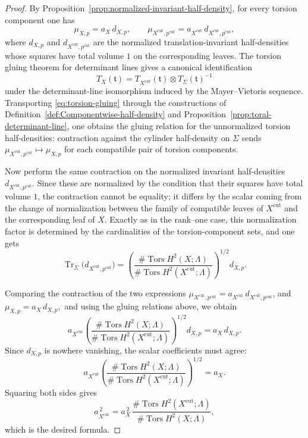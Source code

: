 \documentclass[12pt]{amsart}
\numberwithin{equation}{section}
\begin{document}
\begin{proof}
By Proposition~\ref{prop:normalized-invariant-half-density}, for every torsion component one has
\[
\mu_{X,p}=a_X\,d_{X,p},
\qquad
\mu_{X^{\mathrm{cut}},p^{\mathrm{cut}}}
=
a_{X^{\mathrm{cut}}}\,d_{X^{\mathrm{cut}},p^{\mathrm{cut}}},
\]
where $d_{X,p}$ and $d_{X^{\mathrm{cut}},p^{\mathrm{cut}}}$ are the normalized translation-invariant
half-densities whose squares have total volume $1$ on the corresponding leaves. The torsion gluing theorem for determinant lines gives a canonical identification
\begin{equation}\label{eq:torsion-gluing}
T_X(\mathfrak t)
=
T_{X^{\mathrm{cut}}}(\mathfrak t)\otimes T_\Sigma(\mathfrak t)^{-1}
\end{equation}
under the determinant-line isomorphism induced by the Mayer--Vietoris sequence. Transporting
\eqref{eq:torsion-gluing} through the constructions of
Definition~\ref{def:Componentwise-half-density} and Proposition~\ref{prop:toral-determinant-line}, one obtains
the gluing relation for the unnormalized torsion half-densities: contraction against the cylinder
half-density on $\Sigma$ sends $\mu_{X^{\mathrm{cut}},p^{\mathrm{cut}}}
\mapsto
\mu_{X,p}$ for each compatible pair of torsion components.

Now perform the same contraction on the normalized invariant half-densities
$d_{X^{\mathrm{cut}},p^{\mathrm{cut}}}$. Since these are normalized by the condition that their squares
have total volume $1$, the contraction cannot be equality; it differs by the scalar coming from
the change of normalization between the family of compatible leaves of $X^{\mathrm{cut}}$ and the
corresponding leaf of $X$. Exactly as in the rank--one case, this normalization factor is determined by the
cardinalities of the torsion-component sets, and one gets
\begin{equation}\label{eq:normalized-density-gluing}
\operatorname{Tr}_\Sigma\!\bigl(d_{X^{\mathrm{cut}},p^{\mathrm{cut}}}\bigr)
=
\left(
\frac{\#\operatorname{Tors}H^2(X;\Lambda)}
     {\#\operatorname{Tors}H^2(X^{\mathrm{cut}};\Lambda)}
\right)^{1/2}
d_{X,p}.
\end{equation}

Comparing the contraction of the two expressions
$\mu_{X^{\mathrm{cut}},p^{\mathrm{cut}}}
=
a_{X^{\mathrm{cut}}}\,d_{X^{\mathrm{cut}},p^{\mathrm{cut}}}$, and $\mu_{X,p}=a_X\,d_{X,p},$ and using the gluing relations above, we obtain
\[
a_{X^{\mathrm{cut}}}
\left(
\frac{\#\operatorname{Tors}H^2(X;\Lambda)}
     {\#\operatorname{Tors}H^2(X^{\mathrm{cut}};\Lambda)}
\right)^{1/2}
d_{X,p}
=
a_X\,d_{X,p}.
\]
Since $d_{X,p}$ is nowhere vanishing, the scalar coefficients must agree:
\[
a_{X^{\mathrm{cut}}}
\left(
\frac{\#\operatorname{Tors}H^2(X;\Lambda)}
     {\#\operatorname{Tors}H^2(X^{\mathrm{cut}};\Lambda)}
\right)^{1/2}
=
a_X.
\]
Squaring both sides gives
\[
a_{X^{\mathrm{cut}}}^{\,2}
=
a_X^{\,2}\,
\frac{\#\operatorname{Tors}H^2(X^{\mathrm{cut}};\Lambda)}
     {\#\operatorname{Tors}H^2(X;\Lambda)},
\]
which is the desired formula.
\end{proof}
\end{document}

